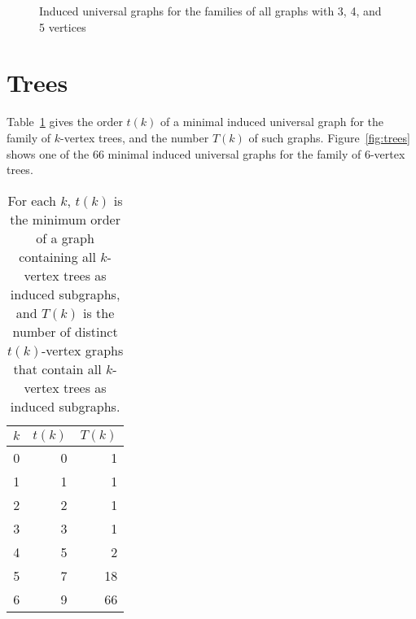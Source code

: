 \documentclass[12pt]{article}
\begin{document}
\begin{figure}[h]
\label{fig:graphs}
\caption{Induced universal graphs for the families of all
graphs with 3, 4, and 5 vertices}
\end{figure}

\section{Trees}

Table~\ref{tab:treeresults} gives the order $t(k)$ of a minimal induced universal graph for
the family of $k$-vertex trees, and the number $T(k)$ of such graphs.  Figure~\ref{fig:trees}
shows one of the 66 minimal induced universal graphs for the family of 6-vertex trees.

\begin{table}[h!]
\centering
\begin{tabular}{r r r}
 \toprule
 $k$ & $t(k)$ & $T(k)$ \\ [0.5ex]
 \midrule
 0 & 0 & 1 \\
 1 & 1 & 1 \\
 2 & 2 & 1 \\
 3 & 3 & 1 \\
 4 & 5 & 2 \\
 5 & 7 & 18 \\
 6 & 9 & 66 \\
 \bottomrule
\end{tabular}
\caption{For each $k$, $t(k)$ is the minimum order of a graph containing all $k$-vertex trees as
induced subgraphs, and $T(k)$ is the number of distinct $t(k)$-vertex graphs that contain
all $k$-vertex trees as induced subgraphs.}
\label{tab:treeresults}
\end{table}
\end{document}
